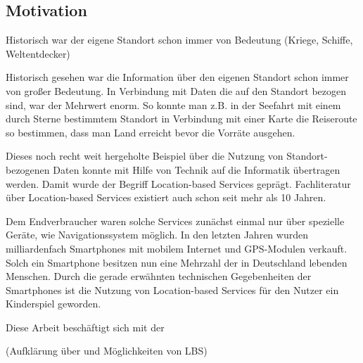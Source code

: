 \subsection{Motivation}

Historisch war der eigene Standort schon immer von Bedeutung (Kriege, Schiffe, Weltentdecker) 

Historisch gesehen war die Information über den eigenen Standort schon immer von großer Bedeutung. In Verbindung mit Daten die auf den Standort bezogen sind, war der Mehrwert enorm. So konnte man z.B. in der Seefahrt mit einem durch Sterne bestimmtem Standort in Verbindung mit einer Karte die Reiseroute so bestimmen, dass man Land erreicht bevor die Vorräte ausgehen.

Dieses noch recht weit hergeholte Beispiel über die Nutzung von Standort-bezogenen Daten konnte mit Hilfe von Technik auf die Informatik übertragen werden. Damit wurde der Begriff Location-based Services geprägt. Fachliteratur über Location-based Services existiert auch schon seit mehr als 10 Jahren. 

Dem Endverbraucher waren solche Services zunächst einmal nur über spezielle Geräte, wie Navigationssystem möglich. In den letzten Jahren wurden milliardenfach Smartphones mit mobilem Internet und GPS-Modulen verkauft. Solch ein Smartphone besitzen nun eine Mehrzahl der in Deutschland lebenden Menschen. Durch die gerade erwähnten technischen Gegebenheiten der Smartphones ist die Nutzung von Location-based Services für den Nutzer ein Kinderspiel geworden. 

Diese Arbeit beschäftigt sich mit der 

(Aufklärung über und Möglichkeiten von LBS)